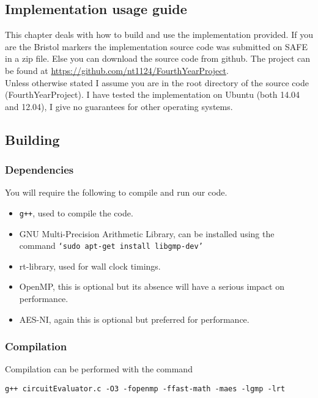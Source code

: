 \documentclass[ %
                    author={Nicholas Tutte},
                supervisor={Prof. Nigel Smart},
                    degree={MEng},
                     title={Secure Two Party Computation},
                  subtitle={A practical comparison of recent protocols},
                      type={Research - GG1K},
                      year={2015} ]{dissertation}
\begin{document}
	\begin{appendices}

		\chapter{Implementation usage guide}
			This chapter deals with how to build and use the implementation provided. If you are the Bristol markers the implementation source code was submitted on SAFE in a zip file. Else you can download the source code from github. The project can be found at \url{https://github.com/nt1124/FourthYearProject}.\\
			
			Unless otherwise stated I assume you are in the root directory of the source code (FourthYearProject). I have tested the implementation on Ubuntu (both 14.04 and 12.04), I give no guarantees for other operating systems.

			\section{Building}
				\subsection{Dependencies}
					You will require the following to compile and run our code.

					\begin{itemize}
						\item \texttt{g++}, used to compile the code.
						\item GNU Multi-Precision Arithmetic Library, can be installed using the command \texttt{`sudo apt-get install libgmp-dev'}
						\item rt-library, used for wall clock timings.
						\item OpenMP, this is optional but its absence will have a serious impact on performance.
						\item AES-NI, again this is optional but preferred for performance.
					\end{itemize}

				\subsection{Compilation} \label{sub:CompilationInstructs}
					Compilation can be performed with the command
					\begin{center}
						\texttt{g++ circuitEvaluator.c -O3 -fopenmp -ffast-math -maes -lgmp -lrt}
					\end{center}


\end{appendices}
\end{document}
